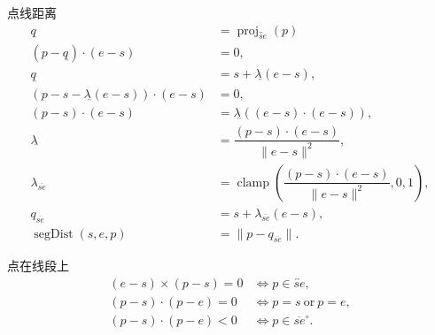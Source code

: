 	\begin{lecture}{点线距离}
	\[
	\begin{aligned}
		q_{\overleftrightarrow{}} &= 
		\operatorname{proj}_{\overleftrightarrow{se}}(p)\\
		(p-q_{\overleftrightarrow{}}) \cdot (e-s) &= 0,\\
		q_{\overleftrightarrow{}} &= s + \lambda_{\overleftrightarrow{}} (e-s),\\
		(p - s - \lambda_{\overleftrightarrow{}} (e-s))\cdot (e-s) &= 0,\\
		(p-s) \cdot (e-s) &= \lambda_{\overleftrightarrow{}}((e-s) \cdot (e-s)),\\
		\lambda_{\overleftrightarrow{}} &= \dfrac{(p-s)\cdot (e-s)}{\lVert e-s \rVert^2},\\
		\lambda_{\overline{se}}	&=
		\operatorname{clamp}\left(
		\dfrac{(p-s)\cdot(e-s)}{\lVert e-s\rVert^2}, 0, 1
		\right),\\
		q_{\overline{se}} &= s+\lambda_{\overline{se}}(e-s),\\
		\operatorname{segDist}(s,e,p) &= \lVert p-q_{\overline{se}}\rVert.
	\end{aligned}
	\]
	\end{lecture}

	\begin{lecture}{点在线段上}
	\[
	\begin{aligned}
		(e-s)\times(p-s)=0
		&\Longleftrightarrow p\in \overleftrightarrow{se},\\
		(p-s)\cdot(p-e)=0
		&\Longleftrightarrow p=s \ \text{or}\ p=e,\\
		(p-s)\cdot(p-e)<0
		&\Longleftrightarrow p\in \overline{se}^{\circ}.
	\end{aligned}
	\]
	\end{lecture}


